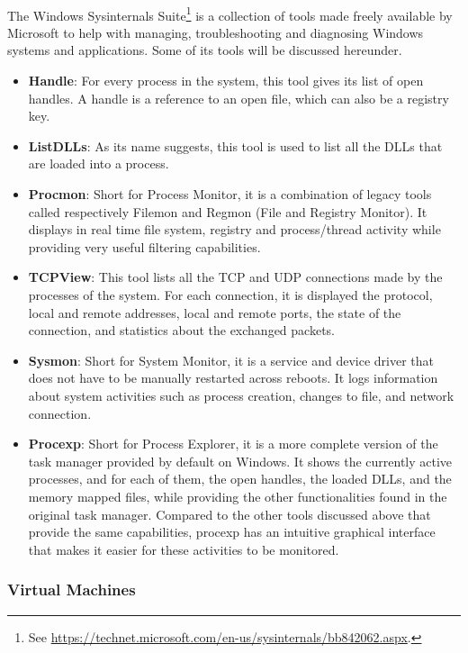 \paragraph{}
The Windows Sysinternals Suite\footnote{See \url{https://technet.microsoft.com/en-us/sysinternals/bb842062.aspx}.} is a collection of tools made freely available by Microsoft to help with managing, troubleshooting and diagnosing Windows systems and applications. Some of its tools will be discussed hereunder.
\begin{itemize}
	\item \textbf{Handle}: For every process in the system, this tool gives its list of open handles. A handle is a reference to an open file, which can also be a registry key.
	\item \textbf{ListDLLs}: As its name suggests, this tool is used to list all the DLLs that are loaded into a process.
	\item \textbf{Procmon}: Short for Process Monitor, it is a combination of legacy tools called respectively Filemon and Regmon (File and Registry Monitor). It displays in real time file system, registry and process/thread activity while providing very useful filtering capabilities.
	\item \textbf{TCPView}: This tool lists all the TCP and UDP connections made by the processes of the system. For each connection, it is displayed the protocol, local and remote addresses, local and remote ports, the state of the connection, and statistics about the exchanged packets.
	\item \textbf{Sysmon}: Short for System Monitor, it is a service and device driver that does not have to be manually restarted across reboots. It logs information about system activities such as process creation, changes to file, and network connection.
	\item \textbf{Procexp}: Short for Process Explorer, it is a more complete version of the task manager provided by default on Windows. It shows the currently active processes, and for each of them, the open handles, the loaded DLLs, and the memory mapped files, while providing the other functionalities found in the original task manager. Compared to the other tools discussed above that provide the same capabilities, procexp has an intuitive graphical interface that makes it easier for these activities to be monitored.
\end{itemize}

\subsubsection{Virtual Machines} \label{sec:virtual_machines}
